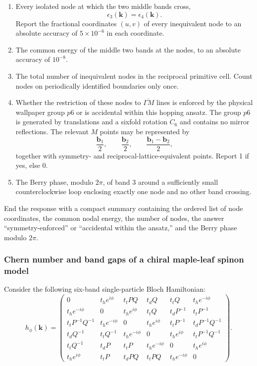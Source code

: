 \begin{enumerate}
    \item Every isolated node at which the two middle bands cross,
    \[
    \epsilon_3(\mathbf{k})=\epsilon_4(\mathbf{k}).
    \]
    Report the fractional coordinates $(u,v)$ of every inequivalent
    node to an absolute accuracy of $5\times10^{-6}$ in each coordinate.

    \item The common energy of the middle two bands at the nodes, to an
    absolute accuracy of $10^{-8}$.

    \item The total number of inequivalent nodes in the reciprocal
    primitive cell. Count nodes on periodically identified boundaries
    only once.

    \item Whether the restriction of these nodes to
    $\overline{\Gamma M}$ lines is enforced by the physical wallpaper
    group $p6$ or is accidental within this hopping ansatz. The group
    $p6$ is generated by translations and a sixfold rotation $C_6$ and
    contains no mirror reflections. The relevant $M$ points may be
    represented by
    \[
    \frac{\mathbf{b}_1}{2},
    \qquad
    \frac{\mathbf{b}_2}{2},
    \qquad
    \frac{\mathbf{b}_1-\mathbf{b}_2}{2},
    \]
    together with symmetry- and reciprocal-lattice-equivalent points. Report 1 if yes, else 0.

    \item The Berry phase, modulo $2\pi$, of band $3$ around a
    sufficiently small counterclockwise loop enclosing exactly one
    node and no other band crossing.
\end{enumerate}
End the response with a compact summary containing the ordered list of
node coordinates, the common nodal energy, the number of nodes, the
answer ``symmetry-enforced'' or ``accidental within the ansatz,'' and
the Berry phase modulo $2\pi$.

\subsubsection{Chern number and band gaps of a chiral maple-leaf spinon model}
\label{problem:maple-leaf-chern-number}
Consider the following six-band single-particle Bloch Hamiltonian:
\[
h_{\phi}(\mathbf{k})=
\begin{pmatrix}
0
& t_h e^{i\phi}
& t_tPQ
& t_dQ
& t_tQ
& t_h e^{-i\phi}
\\
t_h e^{-i\phi}
& 0
& t_h e^{i\phi}
& t_tQ
& t_dP^{-1}
& t_tP^{-1}
\\
t_tP^{-1}Q^{-1}
& t_h e^{-i\phi}
& 0
& t_h e^{i\phi}
& t_tP^{-1}
& t_dP^{-1}Q^{-1}
\\
t_dQ^{-1}
& t_tQ^{-1}
& t_h e^{-i\phi}
& 0
& t_h e^{i\phi}
& t_tP^{-1}Q^{-1}
\\
t_tQ^{-1}
& t_dP
& t_tP
& t_h e^{-i\phi}
& 0
& t_h e^{i\phi}
\\
t_h e^{i\phi}
& t_tP
& t_dPQ
& t_tPQ
& t_h e^{-i\phi}
& 0
\end{pmatrix}.
\]

